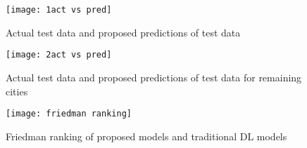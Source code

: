   
  
  \begin{figure}[!ht]
  \centering
  \texttt{[image: 1act vs pred]}
  \caption{Actual test data and proposed predictions of test data}
  \label{Line plot11}
  \end{figure}
  
  \begin{figure}[!ht]
  \centering
  \texttt{[image: 2act vs pred]}
  \caption{Actual test data and proposed predictions of test data for remaining cities}
  \label{Line plot11}
  \end{figure}
  
  
  
  
  
  \begin{figure*}[!ht]
  \centering
  \texttt{[image: friedman ranking]}
  \caption{Friedman ranking of proposed models and traditional DL models}
  \label{Line plot12}
  \end{figure*}
  
  
  
  
  
  
  